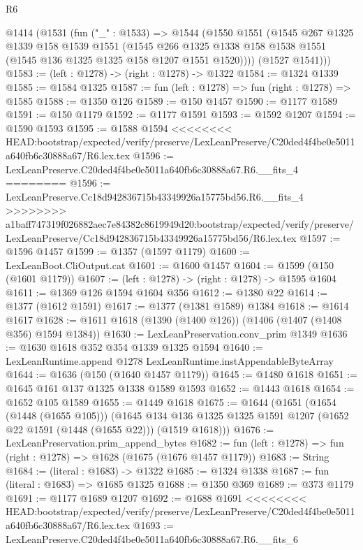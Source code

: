 \begin{lexlean}{R6}
\begin{coremodule}
{{{{{{{{{{{{{{{{{{{{{{{{{{{{{{{{{{{{{{{{{{{{{{{{{{  @1414
    (@1531
      (fun ("_" : @1533) =>
      @1544
        (@1550
          @1551
          (@1545
            @267
            @1325
            @1339
            @158
            @1539
            @1551
            (@1545
              @266
              @1325
              @1338
              @158
              @1538
              @1551
              (@1545 @136 @1325 @1325 @158 @1207 @1551 @1520))))
        (@1527 @1541)))
@1583 := (left : @1278) -> (right : @1278) -> @1322
@1584 := @1324 @1339
@1585 := @1584 @1325
@1587 := fun (left : @1278) => fun (right : @1278) => @1585
@1588 := @1350 @126
@1589 := @150 @1457
@1590 := @1177 @1589
@1591 := @150 @1179
@1592 := @1177 @1591
@1593 := @1592 @1207
@1594 := @1590 @1593
@1595 := @1588 @1594
<<<<<<<< HEAD:bootstrap/expected/verify/preserve/LexLeanPreserve/C20ded4f4be0e5011a640fb6c30888a67/R6.lex.tex
@1596 := LexLeanPreserve.C20ded4f4be0e5011a640fb6c30888a67.R6.__fits_4
========
@1596 := LexLeanPreserve.Cc18d942836715b43349926a15775bd56.R6.__fits_4
>>>>>>>> a1baff747319f026882aec7e84382c8619949d20:bootstrap/expected/verify/preserve/LexLeanPreserve/Cc18d942836715b43349926a15775bd56/R6.lex.tex
@1597 := @1596 @1457
@1599 := @1357 (@1597 @1179)
@1600 := LexLeanBoot.CliOutput.cat
@1601 := @1600 @1457
@1604 := @1599 (@150 (@1601 @1179))
@1607 := (left : @1278) -> (right : @1278) -> @1595 @1604
@1611 := @1369 @126 @1594 @1604 @356
@1612 := @1380 @22
@1614 := @1377 (@1612 @1591)
@1617 := @1377 (@1381 @1589) @1384
@1618 := @1614 @1617
@1628 := @1611 @1618 (@1390 (@1400 @126)) (@1406 (@1407 (@1408 @356) @1594 @1384))
@1630 := LexLeanPreservation.conv_prim @1349
@1636 := @1630 @1618 @352 @354 @1339 @1325 @1594
@1640 := LexLeanRuntime.append @1278 LexLeanRuntime.instAppendableByteArray
@1644 := @1636 (@150 (@1640 @1457 @1179))
@1645 := @1480 @1618
@1651 := @1645 @161 @137 @1325 @1338 @1589 @1593
@1652 := @1443 @1618
@1654 := @1652 @105 @1589
@1655 := @1449 @1618
@1675 := @1644
    (@1651
      (@1654 (@1448 (@1655 @105)))
      (@1645 @134 @136 @1325 @1325 @1591 @1207 (@1652 @22 @1591 (@1448 (@1655 @22))) (@1519 @1618)))
@1676 := LexLeanPreservation.prim_append_bytes
@1682 := fun (left : @1278) => fun (right : @1278) => @1628 (@1675 (@1676 @1457 @1179))
@1683 := String
@1684 := (literal : @1683) -> @1322
@1685 := @1324 @1338
@1687 := fun (literal : @1683) => @1685 @1325
@1688 := @1350 @369
@1689 := @373 @1179
@1691 := @1177 @1689 @1207
@1692 := @1688 @1691
<<<<<<<< HEAD:bootstrap/expected/verify/preserve/LexLeanPreserve/C20ded4f4be0e5011a640fb6c30888a67/R6.lex.tex
@1693 := LexLeanPreserve.C20ded4f4be0e5011a640fb6c30888a67.R6.__fits_6
}}}}}}}}}}}}}}}}}}}}}}}}}}}}}}}}}}}}}}}}}}}}}}}}}}
\end{coremodule}
\end{lexlean}
